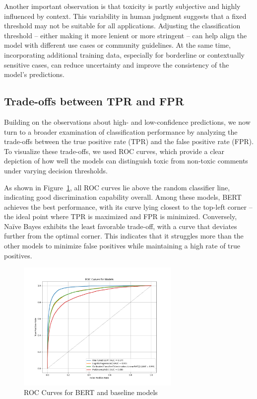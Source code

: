 Another important observation is that toxicity is partly subjective and highly influenced by context. This variability in human judgment suggests that a fixed threshold may not be suitable for all applications. Adjusting the classification threshold -- either making it more lenient or more stringent -- can help align the model with different use cases or community guidelines. At the same time, incorporating additional training data, especially for borderline or contextually sensitive cases, can reduce uncertainty and improve the consistency of the model’s predictions.

\subsection{Trade-offs between TPR and FPR}
Building on the observations about high- and low-confidence predictions, we now turn to a broader examination of classification performance by analyzing the trade-offs between the true positive rate (TPR) and the false positive rate (FPR). To visualize these trade-offs, we used ROC curves, which provide a clear depiction of how well the models can distinguish toxic from non-toxic comments under varying decision thresholds.

As shown in Figure~\ref{fig:roc_curve_test_set}, all ROC curves lie above the random classifier line, indicating good discrimination capability overall. Among these models, BERT achieves the best performance, with its curve lying closest to the top-left corner -- the ideal point where TPR is maximized and FPR is minimized. Conversely, Naïve Bayes exhibits the least favorable trade-off, with a curve that deviates further from the optimal corner. This indicates that it struggles more than the other models to minimize false positives while maintaining a high rate of true positives.

\begin{figure}[ht]
    \centering
    \includegraphics[width=0.7\textwidth]{./figures/combined_roc_curves.png}
    \caption{ROC Curves for BERT and baseline models}
    \label{fig:roc_curve_test_set}
\end{figure}